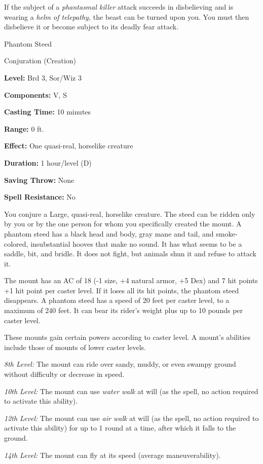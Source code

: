 \documentclass{article}
\begin{document}
If the subject of a \textit{phantasmal killer }attack succeeds in disbelieving 
and is wearing a \textit{helm of telepathy, }the beast can be turned upon you. 
You must then disbelieve it or become subject to its deadly fear attack.

\vspace{12pt}
Phantom Steed

Conjuration (Creation)

\textbf{Level:} Brd 3, Sor/Wiz 3

\textbf{Components:} V, S

\textbf{Casting Time:} 10 minutes

\textbf{Range:} 0 ft.

\textbf{Effect:} One quasi-real, horselike creature

\textbf{Duration:} 1 hour/level (D)

\textbf{Saving Throw:} None

\textbf{Spell Resistance:} No

You conjure a Large, quasi-real, horselike creature. The steed can be ridden only 
by you or by the one person for whom you specifically created the mount. A phantom 
steed has a black head and body, gray mane and tail, and smoke-colored, insubstantial 
hooves that make no sound. It has what seems to be a saddle, bit, and bridle. It 
does not fight, but animals shun it and refuse to attack it.

The mount has an AC of 18 (-1 size, +4 natural armor, +5 Dex) and 7 hit points 
+1 hit point per caster level. If it loses all its hit points, the phantom steed 
disappears. A phantom steed has a speed of 20 feet per caster level, to a maximum 
of 240 feet. It can bear its rider's weight plus up to 10 pounds per caster level.

These mounts gain certain powers according to caster level. A mount's abilities 
include those of mounts of lower caster levels. 

\textit{8th Level: }The mount can ride over sandy, muddy, or even swampy ground 
without difficulty or decrease in speed.

\textit{10th Level: }The mount can use \textit{water walk }at will (as the spell, 
no action required to activate this ability).

\textit{12th Level: }The mount can use \textit{air walk }at will (as the spell, 
no action required to activate this ability) for up to 1 round at a time, after 
which it falls to the ground.

\textit{14th Level: }The mount can fly at its speed (average maneuverability).
\end{document}
